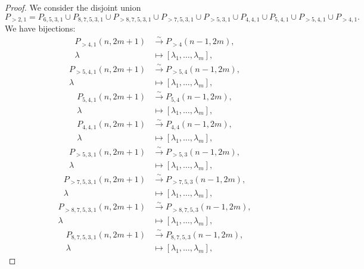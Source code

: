 \documentclass[a4paper, 12pt, reqno]{amsart}
\theoremstyle{remark}
\begin{document}
\begin{proof}
  We consider the disjoint union
  \begin{equation*}
    P_{>2, 1} = P_{6, 5, 3, 1} \cup P_{8, 7, 5, 3, 1} \cup P_{>8, 7, 5, 3, 1} \cup P_{>7, 5, 3, 1} \cup P_{>5, 3, 1} \cup P_{4, 4, 1} \cup P_{5, 4, 1} \cup P_{>5, 4, 1} \cup P_{>4, 1}.
  \end{equation*}
  We have bijections:
  \begin{align*}
    P_{>4, 1}(n, 2m + 1) &\xrightarrow{\sim} P_{>4}(n - 1, 2m), \\
    \lambda &\mapsto [\lambda_1, \dots, \lambda_m],
  \end{align*}
  \begin{align*}
    P_{>5, 4, 1}(n, 2m + 1) &\xrightarrow{\sim} P_{>5, 4}(n - 1, 2m), \\
    \lambda &\mapsto [\lambda_1, \dots, \lambda_m],
  \end{align*}
  \begin{align*}
    P_{5, 4, 1}(n, 2m + 1) &\xrightarrow{\sim} P_{5, 4}(n - 1, 2m), \\
    \lambda &\mapsto [\lambda_1, \dots, \lambda_m],
  \end{align*}
  \begin{align*}
    P_{4, 4, 1}(n, 2m + 1) &\xrightarrow{\sim} P_{4, 4}(n - 1, 2m), \\
    \lambda &\mapsto [\lambda_1, \dots, \lambda_m],
  \end{align*}
  \begin{align*}
    P_{>5, 3, 1}(n, 2m + 1) &\xrightarrow{\sim} P_{>5, 3}(n - 1, 2m), \\
    \lambda &\mapsto [\lambda_1, \dots, \lambda_m],
  \end{align*}
  \begin{align*}
    P_{>7, 5, 3, 1}(n, 2m + 1) &\xrightarrow{\sim} P_{>7, 5, 3}(n - 1, 2m), \\
    \lambda &\mapsto [\lambda_1, \dots, \lambda_m],
  \end{align*}
  \begin{align*}
    P_{>8, 7, 5, 3, 1}(n, 2m + 1) &\xrightarrow{\sim} P_{>8, 7, 5, 3}(n - 1, 2m), \\
    \lambda &\mapsto [\lambda_1, \dots, \lambda_m],
  \end{align*}
  \begin{align*}
    P_{8, 7, 5, 3, 1}(n, 2m + 1) &\xrightarrow{\sim} P_{8, 7, 5, 3}(n - 1, 2m), \\
    \lambda &\mapsto [\lambda_1, \dots, \lambda_m],
  \end{align*}

\end{proof}
\end{document}
